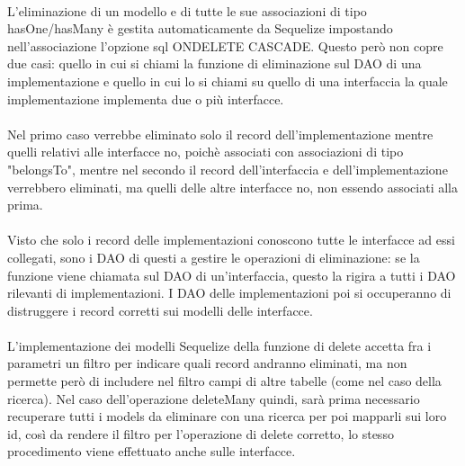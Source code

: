 \documentclass[a4paper, 12pt]{report}
\begin{document}
      \paragraph*{}
      L'eliminazione di un modello e di tutte le sue associazioni di tipo hasOne/hasMany è gestita automaticamente da Sequelize impostando nell'associazione l'opzione sql ONDELETE CASCADE.
      Questo però non copre due casi: quello in cui si chiami la funzione di eliminazione sul DAO di una implementazione e quello in cui lo si chiami su quello di una interfaccia la quale implementazione implementa due o più interfacce.
      \paragraph*{}
      Nel primo caso verrebbe eliminato solo il record dell'implementazione mentre quelli relativi alle interfacce no, poichè associati con associazioni di tipo "belongsTo", mentre nel secondo il record dell'interfaccia e dell'implementazione verrebbero eliminati, ma quelli delle altre interfacce no, non essendo associati alla prima.
      \paragraph*{}
      Visto che solo i record delle implementazioni conoscono tutte le interfacce ad essi collegati, sono i DAO di questi a gestire le operazioni di eliminazione: se la funzione viene chiamata sul DAO di un'interfaccia, questo la rigira a tutti i DAO rilevanti di implementazioni.
      I DAO delle implementazioni poi si occuperanno di distruggere i record corretti sui modelli delle interfacce.
      \paragraph*{}
      L'implementazione dei modelli Sequelize della funzione di delete accetta fra i parametri un filtro per indicare quali record andranno eliminati, ma non permette però di includere nel filtro campi di altre tabelle (come nel caso della ricerca).
      Nel caso dell'operazione deleteMany quindi, sarà prima necessario recuperare tutti i models da eliminare con una ricerca per poi mapparli sui loro id, così da rendere il filtro per l'operazione di delete corretto, lo stesso procedimento viene effettuato anche sulle interfacce.
    \newpage
\end{document}
